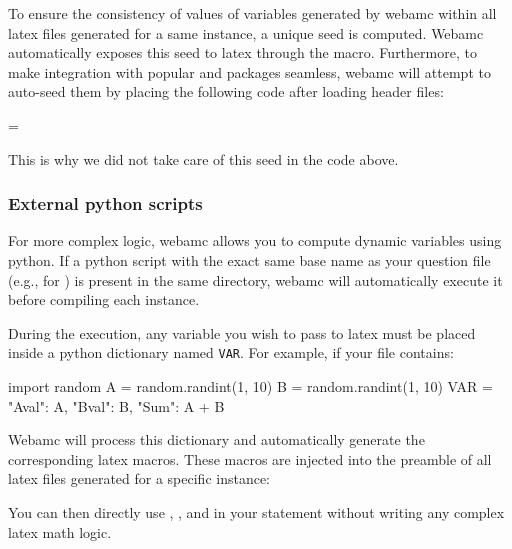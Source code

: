 To ensure the consistency of values of variables generated by webamc
within all latex files generated for a same instance, a unique seed is
computed. Webamc automatically exposes this seed to latex through the
\lstinlinetex{\\WEBAMCseed} macro. Furthermore, to make integration
with popular  and  packages seamless, webamc will
attempt to auto-seed them by placing the following code after loading
header files:
\begin{tex}
\ifdefined\FPseed\FPseed=\WEBAMCseed\fi
\ifdefined\pgfmathsetseed\pgfmathsetseed\WEBAMCseed\fi
\end{tex}
This is why we did not take care of this seed in the code above.
\subsubsection{External python scripts}
For more complex logic, webamc allows you to compute dynamic variables
using python. If a python script with the exact same base name as your
question file (e.g.,  for ) is
present in the same directory, webamc will automatically execute it
before compiling each instance.

During the execution, any variable you wish to pass to latex must be
placed inside a python dictionary named \verb+VAR+. For example, if
your file  contains:
\begin{python}
import random
A = random.randint(1, 10)
B = random.randint(1, 10)
VAR = {
    "Aval": A,
    "Bval": B,
    "Sum": A + B
}
\end{python}

Webamc will process this dictionary and automatically generate the
corresponding latex macros. These macros are injected into the
preamble of all latex files generated for a specific instance:
\begin{tex}
\def\WEBAMCVARAval{...}
\def\WEBAMCVARBval{...}
\def\WEBAMCVARSum{...}
\end{tex}

You can then directly use \lstinlinetex{\\WEBAMCVARAval},
\lstinlinetex{\\WEBAMCVARBval}, and \lstinlinetex{\\WEBAMCVARSum} in
your  statement without writing any complex latex
math logic.
